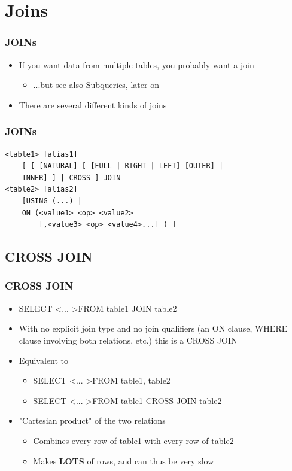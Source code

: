 \documentclass{beamer}
\begin{document}
\section{Joins}

\begin{frame}
    \frametitle{JOINs}
    \begin{itemize}
        \item If you want data from multiple tables, you probably want a join
        \begin{itemize}
            \item ...but see also Subqueries, later on
        \end{itemize}
        \item There are several different kinds of joins
    \end{itemize}
\end{frame}

\begin{frame}[fragile]
    \frametitle{JOINs}
    \begin{verbatim}
<table1> [alias1]
    [ [ [NATURAL] [ [FULL | RIGHT | LEFT] [OUTER] |
    INNER] ] | CROSS ] JOIN
<table2> [alias2]
    [USING (...) |
    ON (<value1> <op> <value2>
        [,<value3> <op> <value4>...] ) ]
    \end{verbatim}
\end{frame}

\subsection{CROSS JOIN}

\begin{frame}
    \frametitle{CROSS JOIN}
    \begin{itemize}
        \item SELECT \textless ... \textgreater FROM table1 JOIN table2
        \item With no explicit join type and no join qualifiers (an ON clause, WHERE clause involving both relations, etc.) this is a CROSS JOIN
        \item Equivalent to
        \begin{itemize}
            \item SELECT \textless ... \textgreater FROM table1, table2
            \item SELECT \textless ... \textgreater FROM table1 CROSS JOIN table2
        \end{itemize}
        \item "Cartesian product" of the two relations
        \begin{itemize}
            \item Combines every row of table1 with every row of table2
            \item Makes \textbf{LOTS} of rows, and can thus be very slow
        \end{itemize}
    \end{itemize}
\end{frame}
\end{document}
